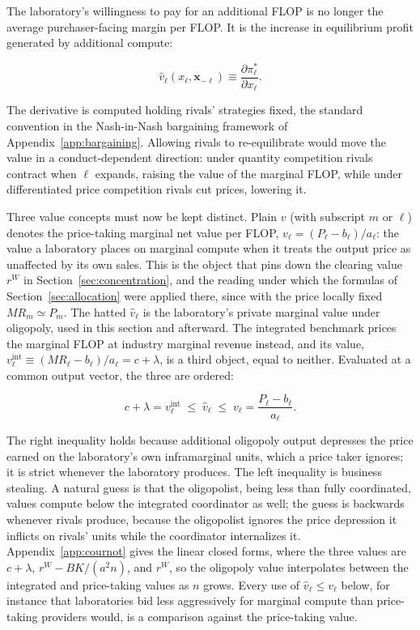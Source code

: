 \documentclass[11pt]{article}
\begin{document}
The laboratory's willingness to pay for an additional FLOP is no longer the average purchaser-facing margin per FLOP. It is the increase in equilibrium profit generated by additional compute:

\begin{equation}\label{eq:vhat-def}\widehat v_\ell(x_\ell,\mathbf x_{-\ell})\equiv\frac{\partial\pi_\ell^*}{\partial x_\ell}.\end{equation}

The derivative is computed holding rivals' strategies fixed, the standard convention in the Nash-in-Nash bargaining framework of Appendix~\ref{app:bargaining}. Allowing rivals to re-equilibrate would move the value in a conduct-dependent direction: under quantity competition rivals contract when $\ell$ expands, raising the value of the marginal FLOP, while under differentiated price competition rivals cut prices, lowering it.

Three value concepts must now be kept distinct. Plain $v$ (with subscript $m$ or $\ell$) denotes the price-taking marginal net value per FLOP, $v_\ell=(P_\ell-b_\ell)/a_\ell$: the value a laboratory places on marginal compute when it treats the output price as unaffected by its own sales. This is the object that pins down the clearing value $r^W$ in Section~\ref{sec:concentration}, and the reading under which the formulas of Section~\ref{sec:allocation} were applied there, since with the price locally fixed $MR_m\simeq P_m$. The hatted $\widehat v_\ell$ is the laboratory's private marginal value under oligopoly, used in this section and afterward. The integrated benchmark prices the marginal FLOP at industry marginal revenue instead, and its value, $v^{\mathrm{int}}_\ell\equiv(MR_\ell-b_\ell)/a_\ell=c+\lambda$, is a third object, equal to neither. Evaluated at a common output vector, the three are ordered:

\begin{equation}c+\lambda=v^{\mathrm{int}}_\ell\;\leq\;\widehat v_\ell\;\leq\;v_\ell=\frac{P_\ell-b_\ell}{a_\ell}.\end{equation}

The right inequality holds because additional oligopoly output depresses the price earned on the laboratory's own inframarginal units, which a price taker ignores; it is strict whenever the laboratory produces. The left inequality is business stealing. A natural guess is that the oligopolist, being less than fully coordinated, values compute below the integrated coordinator as well; the guess is backwards whenever rivals produce, because the oligopolist ignores the price depression it inflicts on rivals' units while the coordinator internalizes it. Appendix~\ref{app:cournot} gives the linear closed forms, where the three values are $c+\lambda$, $r^W-BK/(a^2 n)$, and $r^W$, so the oligopoly value interpolates between the integrated and price-taking values as $n$ grows. Every use of $\widehat v_\ell\leq v_\ell$ below, for instance that laboratories bid less aggressively for marginal compute than price-taking providers would, is a comparison against the price-taking value.
\end{document}
